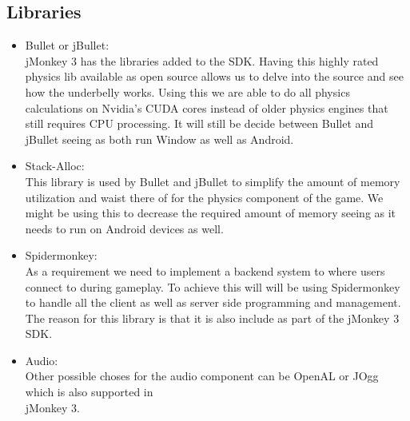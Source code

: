\documentclass[letterpaper]{article}
\begin{document}
			\vspace{0.1cm}
			
			\subsection*{Libraries}
			
			\vspace{0.1cm}
			
			\begin{itemize}
				\item Bullet or jBullet: \\
					jMonkey 3 has the libraries added to the SDK. Having this highly rated physics lib available as open source allows us to delve into the source and see how the underbelly works. Using this we are able to do all physics calculations on Nvidia's CUDA cores instead of older physics engines that still requires CPU processing. It will still be decide between Bullet and jBullet seeing as both run Window as well as Android.
					
				\item Stack-Alloc: \\
					This library is used by Bullet and jBullet to simplify the amount of memory utilization and waist there of for the physics component of the game. We might be using this to decrease the required amount of memory seeing as it needs to run on Android devices as well.
				
				\item Spidermonkey:\\
					As a requirement we need to implement a backend system to where users connect to during gameplay. To achieve this will will be using Spidermonkey to handle all the client as well as server side programming and management. The reason for this library is that it is also include as part of the jMonkey 3 SDK.
				
				\item Audio: \\
					Other possible choses for the audio component can be OpenAL or JOgg which is also supported in \\ jMonkey 3.
									

\end{itemize}
\end{document}
